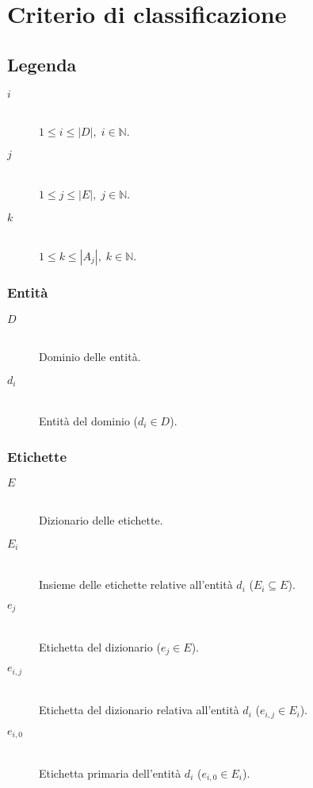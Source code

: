 \chapter{Criterio di classificazione}
\label{ch:appendice:classificazione}

\section*{Legenda}

\begin{description}
	\item[$i$] \hfill \\
	$1 \leq i \leq \left|D\right|,\; i \in \mathbb{N}$.
	\item[$j$] \hfill \\
	$1 \leq j \leq \left|E\right|,\; j \in \mathbb{N}$.
	\item[$k$] \hfill \\
	$1 \leq k \leq \left|A_j\right|,\; k \in \mathbb{N}$.
\end{description}

\subsection*{Entità}
\begin{description}
	\item[$D$] \hfill \\
	Dominio delle entità.
	\item[$d_i$] \hfill \\
	Entità del dominio ($d_i \in D$).
\end{description}	

\subsection*{Etichette}
\begin{description}
	\item[$E$] \hfill \\
	Dizionario delle etichette.
	\item[$E_i$] \hfill \\
	Insieme delle etichette relative all'entità $d_i$ ($E_i \subseteq E$).
	\item[$e_j$] \hfill \\
	Etichetta del dizionario ($e_j \in E$).
	\item[$e_{i,j}$] \hfill \\
	Etichetta del dizionario relativa all'entità $d_i$ ($e_{i,j} \in E_i$).
	\item[$e_{i,0}$] \hfill \\
	Etichetta primaria dell'entità $d_i$ ($e_{i,0} \in E_i$).
\end{description}

